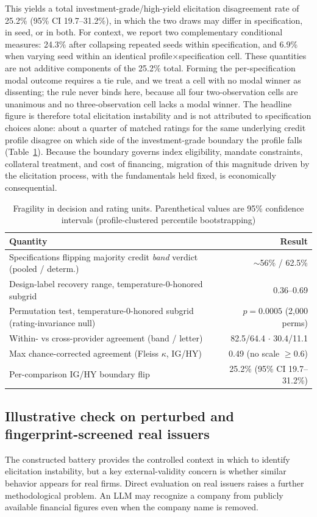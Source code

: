 \documentclass[a4paper,fleqn]{cas-sc}
\begin{document}
This yields a total investment-grade/high-yield elicitation disagreement rate of 25.2\%
(95\% CI 19.7--31.2\%), in which the two draws may differ in specification, in seed, or in both.
For context, we report two complementary conditional measures: 24.3\% after collapsing repeated
seeds within specification, and 6.9\% when varying seed within an identical
profile$\times$specification cell. These quantities are not additive components of the 25.2\%
total. Forming the per-specification modal outcome requires a tie rule, and we treat a cell with no
modal winner as dissenting; the rule never binds here, because all four two-observation cells are
unanimous and no three-observation cell lacks a modal winner. The headline figure is therefore
total elicitation instability and is not attributed to specification choices alone: about a quarter of
matched ratings for the same underlying credit profile disagree on which side of the investment-grade
boundary the profile falls (Table~\ref{tab:frag}). Because the boundary governs index eligibility,
mandate constraints, collateral treatment, and cost of financing, migration of this magnitude driven
by the elicitation process, with the fundamentals held fixed, is economically consequential.

\begin{table}[t]\centering
\caption{Fragility in decision and rating units. Parenthetical values are 95\% confidence intervals
(profile-clustered percentile bootstrapping)}\label{tab:frag}
\begin{tabular}{lr}\toprule
Quantity & Result \\\midrule
Specifications flipping majority credit \emph{band} verdict (pooled / determ.) & $\sim$56\% / 62.5\% \\
Design-label recovery range, temperature-0-honored subgrid & 0.36--0.69 \\
Permutation test, temperature-0-honored subgrid (rating-invariance null) & $p=0.0005$ (2{,}000 perms) \\
Within- vs cross-provider agreement (band / letter) & 82.5/64.4 $\cdot$ 30.4/11.1 \\
Max chance-corrected agreement (Fleiss $\kappa$, IG/HY) & 0.49 (no scale $\geq0.6$) \\
Per-comparison IG/HY boundary flip & 25.2\% (95\% CI 19.7--31.2\%) \\\bottomrule
\end{tabular}\end{table}

\subsection{Illustrative check on perturbed and fingerprint-screened real issuers}\label{sec:realarm}
The constructed battery provides the controlled context in which to identify elicitation instability, but
a key external-validity concern is whether similar behavior appears for real firms. Direct evaluation on
real issuers raises a further methodological problem. An LLM may recognize a company from publicly
available financial figures even when the company name is removed.
\end{document}
